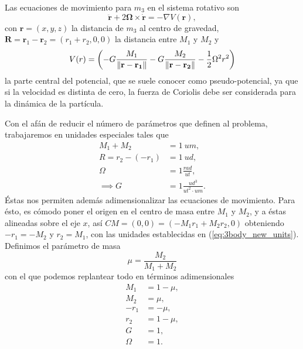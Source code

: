 Las ecuaciones de movimiento para $m_3$ en el sistema rotativo son
\begin{equation}
 \ddot{\mathbf{r}} + 2\mathbf{\Omega} \times \dot{\mathbf{r}} = - \nabla V(\mathbf{r}),
 \label{eq:3body_restricted_acceleration}
\end{equation}
con $\mathbf{r} = (x,y,z)$ la distancia de $m_3$ al centro de gravedad, $\mathbf{R} = \mathbf{r}_1 - \mathbf{r}_2 = (r_1 + r_2,0,0)$ la distancia entre $M_1$ y $M_2$ y
\begin{equation}
 V(r) = \left( -G \frac{M_1}{\left\lVert\mathbf{r}-\mathbf{r_1}\right\rVert} - G \frac{M_2}{\left\lVert\mathbf{r}-\mathbf{r_2}\right\rVert} - \frac{1}{2} \Omega^2 r^2 \right)
 \label{eq:3body_restricted_potential}
\end{equation} 
la parte central del potencial, que se suele conocer como pseudo-potencial, ya que si la velocidad es distinta de cero, la fuerza de Coriolis debe ser considerada para la dinámica de la partícula.

Con el afán de reducir el número de parámetros que definen al problema, trabajaremos en unidades especiales tales que 
\begin{align}
 M_1 + M_2 &= 1 \ um, \nonumber \\
 R = r_2 - (-r_1) &= 1 \ ud, \nonumber \\
 \Omega &= 1 \frac{rad}{ut}, \nonumber \\
 \implies G &= 1 \frac{ud^3}{ut^2 \cdot um}. 
 \label{eq:3body_new_units}
\end{align}
Éstas nos permiten además adimensionalizar las ecuaciones de movimiento. Para ésto, es cómodo poner el origen en el centro de masa entre $M_1$ y $M_2$, y a éstas alineadas sobre el eje $x$, así $CM = (0,0) = (-M_1r_1 + M_2r_2, 0)$ obteniendo $-r_1 = -M_2$ y $r_2 =M_1$, con las unidades establecidas en (\ref{eq:3body_new_units}). Definimos el parámetro de masa 
\begin{equation*}
 \mu = \frac{M_2}{M_1 + M_2} 
\end{equation*}
con el que podemos replantear todo en términos adimensionales
\begin{align}
 M_1 &= 1 - \mu, \nonumber \\
 M_2 &= \mu, \nonumber \\
 -r_1 &= -\mu, \nonumber \\
 r_2 &= 1 - \mu, \nonumber \\
 G &= 1 \nonumber, \\
 \Omega &= 1.
 \label{eq:3body_adimensional_units}
\end{align}

